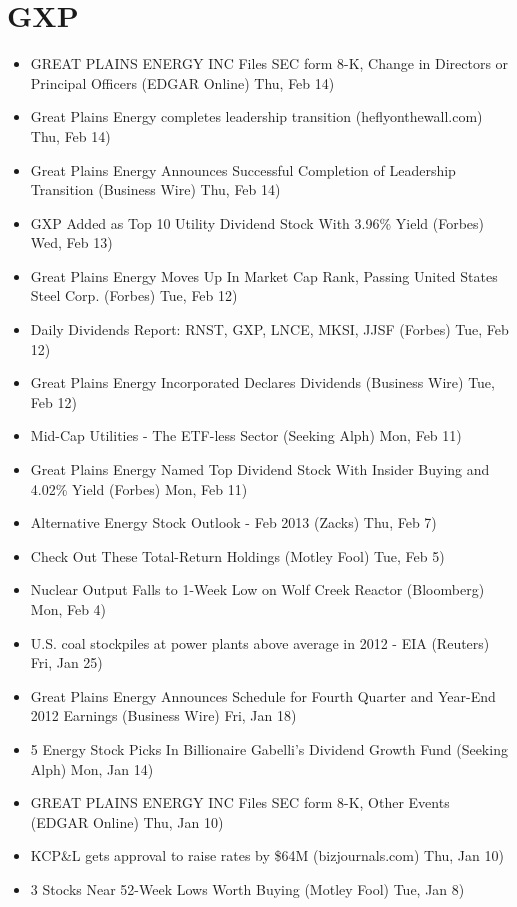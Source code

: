 \documentclass[11pt,asymmetric]{article}
\begin{document}
\section*{GXP}
\begin{itemize}
\item GREAT PLAINS ENERGY INC Files SEC form 8-K, Change in Directors or Principal Officers (EDGAR Online) Thu, Feb 14)
\item Great Plains Energy completes leadership transition (heflyonthewall.com) Thu, Feb 14)
\item Great Plains Energy Announces Successful Completion of Leadership Transition (Business Wire) Thu, Feb 14)
\item GXP Added as Top 10 Utility Dividend Stock With 3.96\% Yield (Forbes) Wed, Feb 13)
\item Great Plains Energy Moves Up In Market Cap Rank, Passing United States Steel Corp. (Forbes) Tue, Feb 12)
\item Daily Dividends Report: RNST, GXP, LNCE, MKSI, JJSF (Forbes) Tue, Feb 12)
\item Great Plains Energy Incorporated Declares Dividends (Business Wire) Tue, Feb 12)
\item Mid-Cap Utilities - The ETF-less Sector (Seeking Alph) Mon, Feb 11)
\item Great Plains Energy Named Top Dividend Stock With Insider Buying and 4.02\% Yield (Forbes) Mon, Feb 11)
\item Alternative Energy Stock Outlook - Feb 2013 (Zacks) Thu, Feb 7)
\item Check Out These Total-Return Holdings (Motley Fool) Tue, Feb 5)
\item Nuclear Output Falls to 1-Week Low on Wolf Creek Reactor (Bloomberg) Mon, Feb 4)
\item U.S. coal stockpiles at power plants above average in 2012 - EIA (Reuters) Fri, Jan 25)
\item Great Plains Energy Announces Schedule for Fourth Quarter and Year-End 2012 Earnings (Business Wire) Fri, Jan 18)
\item 5 Energy Stock Picks In Billionaire Gabelli's Dividend Growth Fund (Seeking Alph) Mon, Jan 14)
\item GREAT PLAINS ENERGY INC Files SEC form 8-K, Other Events (EDGAR Online) Thu, Jan 10)
\item KCP\&L gets approval to raise rates by \$64M (bizjournals.com) Thu, Jan 10)
\item 3 Stocks Near 52-Week Lows Worth Buying (Motley Fool) Tue, Jan 8)

\end{itemize}
\end{document}
